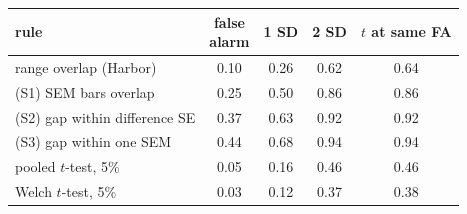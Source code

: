 \begin{tabular}{lcccc}
\toprule
rule & \shortstack{false\\alarm} & 1 SD & 2 SD & \shortstack{$t$ at\\same FA} \\
\midrule
range overlap (Harbor) & 0.10 & 0.26 & 0.62 & 0.64 \\
(S1) SEM bars overlap & 0.25 & 0.50 & 0.86 & 0.86 \\
(S2) gap within difference SE & 0.37 & 0.63 & 0.92 & 0.92 \\
(S3) gap within one SEM & 0.44 & 0.68 & 0.94 & 0.94 \\
pooled $t$-test, 5\% & 0.05 & 0.16 & 0.46 & 0.46 \\
Welch $t$-test, 5\% & 0.03 & 0.12 & 0.37 & 0.38 \\
\bottomrule
\end{tabular}

